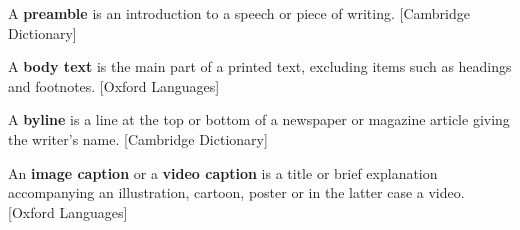 \documentclass[oneside, english, bibtex]{kththesis}
\begin{document}
\begin{definition}
\label{preamble}
A \textbf{preamble} is an introduction to a speech or piece of writing. [Cambridge Dictionary]
\end{definition}

\begin{definition}
\label{body text}
A \textbf{body text} is the main part of a printed text, excluding items such as headings and footnotes. [Oxford Languages]
\end{definition}

\begin{definition}
\label{byline}
A \textbf{byline} is a line at the top or bottom of a newspaper or magazine article giving the writer's name. [Cambridge Dictionary]
\end{definition}

\begin{definition}
\label{img}
An \textbf{image caption} or a \textbf{video caption} is a title or brief explanation accompanying an illustration, cartoon, poster or in the latter case a video. [Oxford Languages]
\end{definition}

\label{pg:lastPageofMainmatter}

\clearpage
\fancyhead{}  %
\end{document}
